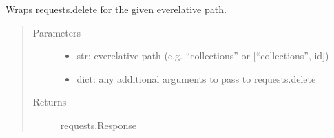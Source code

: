 \documentclass[letterpaper,10pt,english]{sphinxmanual}
\begin{document}

\begin{fulllineitems}
\label{\detokenize{autoapi/pine/backend/data/service/index:pine.backend.data.service.delete}}
Wraps requests.delete for the given eve\sphinxhyphen{}relative path.
\begin{quote}\begin{description}
\item[{Parameters}] \leavevmode\begin{itemize}
\item {} 
 \textendash{} str: eve\sphinxhyphen{}relative path (e.g. “collections” or {[}“collections”, id{]})

\item {} 
 \textendash{} 
dict: any additional arguments to pass to requests.delete


\end{itemize}

\item[{Returns}] \leavevmode
requests.Response

\end{description}\end{quote}

\end{fulllineitems}

\end{document}
